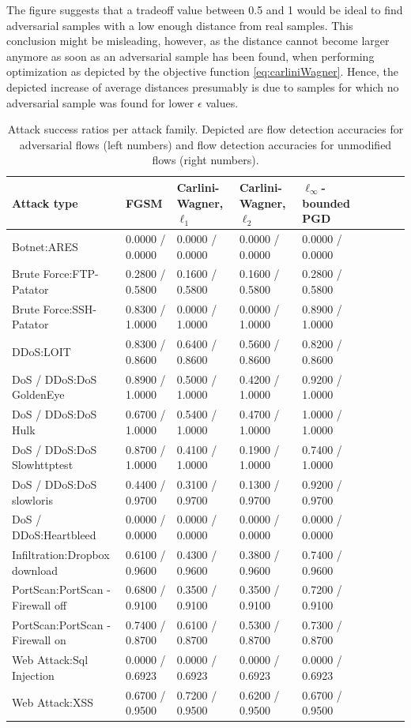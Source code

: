 \documentclass[conference]{IEEEtran}
\begin{document}
The figure suggests that a tradeoff value between 0.5 and 1 would be ideal to find adversarial samples with a low enough distance from real samples. This conclusion might be misleading, however, as the distance cannot become larger anymore as soon as an adversarial sample has been found, when performing optimization as depicted by the objective function \eqref{eq:carliniWagner}. Hence, the depicted increase of average distances presumably is due to samples for which no adversarial sample was found for lower $\epsilon$ values.


\begin{table}
\caption{Attack success ratios per attack family. Depicted are flow detection accuracies for adversarial flows (left numbers) and flow detection accuracies for unmodified flows (right numbers).}
\label{tab:adv_per_family}
\centering
\begin{tabular}{lllllllll}
\toprule
Attack type & FGSM & Carlini-Wagner, $\ell_1$ & Carlini-Wagner, $\ell_2$ & $\ell_\infty$-bounded PGD \\
\midrule
Botnet:ARES	&	0.0000 / 0.0000	&	0.0000 / 0.0000	&	0.0000 / 0.0000	&	0.0000 / 0.0000	\\
Brute Force:FTP-Patator	&	0.2800 / 0.5800	&	0.1600 / 0.5800	&	0.1600 / 0.5800	&	0.2800 / 0.5800	\\
Brute Force:SSH-Patator	&	0.8300 / 1.0000	&	0.0000 / 1.0000	&	0.0000 / 1.0000	&	0.8900 / 1.0000	\\
DDoS:LOIT	&	0.8300 / 0.8600	&	0.6400 / 0.8600	&	0.5600 / 0.8600	&	0.8200 / 0.8600	\\
DoS / DDoS:DoS GoldenEye	&	0.8900 / 1.0000	&	0.5000 / 1.0000	&	0.4200 / 1.0000	&	0.9200 / 1.0000	\\
DoS / DDoS:DoS Hulk	&	0.6700 / 1.0000	&	0.5400 / 1.0000	&	0.4700 / 1.0000	&	1.0000 / 1.0000	\\
DoS / DDoS:DoS Slowhttptest	&	0.8700 / 1.0000	&	0.4100 / 1.0000	&	0.1900 / 1.0000	&	0.7400 / 1.0000	\\
DoS / DDoS:DoS slowloris	&	0.4400 / 0.9700	&	0.3100 / 0.9700	&	0.1300 / 0.9700	&	0.9200 / 0.9700	\\
DoS / DDoS:Heartbleed	&	0.0000 / 0.0000	&	0.0000 / 0.0000	&	0.0000 / 0.0000	&	0.0000 / 0.0000	\\
Infiltration:Dropbox download 	&	0.6100 / 0.9600	&	0.4300 / 0.9600	&	0.3800 / 0.9600	&	0.7400 / 0.9600	\\
PortScan:PortScan - Firewall off	&	0.6800 / 0.9100	&	0.3500 / 0.9100	&	0.3500 / 0.9100	&	0.7200 / 0.9100	\\
PortScan:PortScan - Firewall on	&	0.7400 / 0.8700	&	0.6100 / 0.8700	&	0.5300 / 0.8700	&	0.7300 / 0.8700	\\
Web Attack:Sql Injection	&	0.0000 / 0.6923	&	0.0000 / 0.6923	&	0.0000 / 0.6923	&	0.0000 / 0.6923	\\
Web Attack:XSS	&	0.6700 / 0.9500	&	0.7200 / 0.9500	&	0.6200 / 0.9500	&	0.6700 / 0.9500	\\
\bottomrule

\end{tabular}
\end{table}
\end{document}
